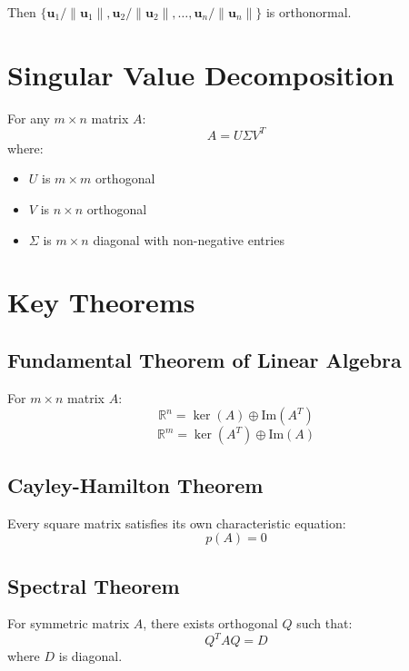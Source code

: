 \documentclass[11pt]{article}
\begin{document}
Then $\{\mathbf{u}_1/\|\mathbf{u}_1\|, \mathbf{u}_2/\|\mathbf{u}_2\|, \ldots, \mathbf{u}_n/\|\mathbf{u}_n\|\}$ is orthonormal.

\section{Singular Value Decomposition}

For any $m \times n$ matrix $A$:
$$A = U\Sigma V^T$$
where:
\begin{itemize}
    \item $U$ is $m \times m$ orthogonal
    \item $V$ is $n \times n$ orthogonal  
    \item $\Sigma$ is $m \times n$ diagonal with non-negative entries
\end{itemize}

\section{Key Theorems}

\subsection{Fundamental Theorem of Linear Algebra}
For $m \times n$ matrix $A$:
$$\mathbb{R}^n = \ker(A) \oplus \text{Im}(A^T)$$
$$\mathbb{R}^m = \ker(A^T) \oplus \text{Im}(A)$$

\subsection{Cayley-Hamilton Theorem}
Every square matrix satisfies its own characteristic equation:
$$p(A) = 0$$

\subsection{Spectral Theorem}
For symmetric matrix $A$, there exists orthogonal $Q$ such that:
$$Q^T A Q = D$$
where $D$ is diagonal.
\end{document}
